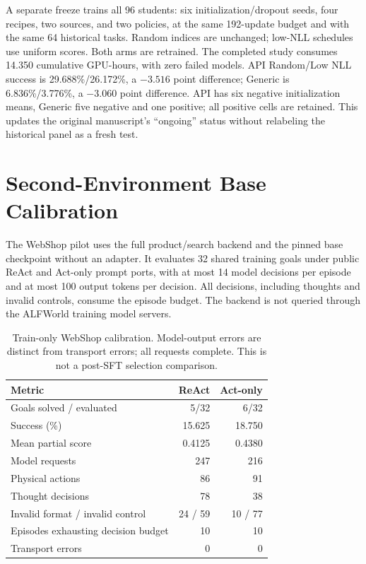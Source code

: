 A separate freeze trains all 96 students: six initialization/dropout seeds, four recipes, two sources, and two policies, at the same 192-update budget and with the same 64 historical tasks. Random indices are unchanged; low-NLL schedules use uniform scores. Both arms are retrained. The completed study consumes 14.350 cumulative GPU-hours, with zero failed models. API Random/Low NLL success is 29.688\%/26.172\%, a $-3.516$ point difference; Generic is 6.836\%/3.776\%, a $-3.060$ point difference. API has six negative initialization means, Generic five negative and one positive; all positive cells are retained. This updates the original manuscript's ``ongoing'' status without relabeling the historical panel as a fresh test.

\clearpage
\section{Second-Environment Base Calibration}
\label{app:webshop}
The WebShop pilot uses the full product/search backend and the pinned base checkpoint without an adapter. It evaluates 32 shared training goals under public ReAct and Act-only prompt ports, with at most 14 model decisions per episode and at most 100 output tokens per decision. All decisions, including thoughts and invalid controls, consume the episode budget. The backend is not queried through the ALFWorld training model servers.

\begin{table}[h]
\centering
\caption{Train-only WebShop calibration. Model-output errors are distinct from transport errors; all requests complete. This is not a post-SFT selection comparison.}
\label{tab:webshop}
\small
\begin{tabular}{lrr}
\toprule
Metric & ReAct & Act-only\\
\midrule
Goals solved / evaluated & 5/32 & 6/32\\
Success (\%) & 15.625 & 18.750\\
Mean partial score & 0.4125 & 0.4380\\
Model requests & 247 & 216\\
Physical actions & 86 & 91\\
Thought decisions & 78 & 38\\
Invalid format / invalid control & 24 / 59 & 10 / 77\\
Episodes exhausting decision budget & 10 & 10\\
Transport errors & 0 & 0\\
\bottomrule
\end{tabular}
\end{table}

